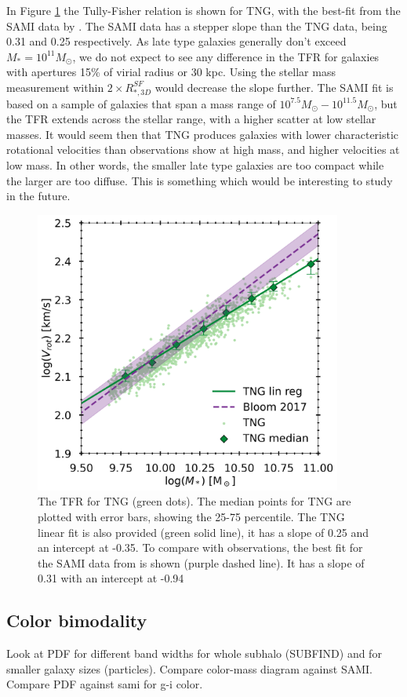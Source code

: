 In Figure \ref{TFR} the Tully-Fisher relation is shown for TNG, with the best-fit from the SAMI data by \textcite{Bloom2017}. The SAMI data has a stepper slope than the TNG data, being 0.31 and 0.25 respectively. As late type galaxies generally don't exceed $M_* = 10^{11} M_{\odot}$, we do not expect to see any difference in the TFR for galaxies with apertures 15\% of virial radius or 30 kpc. Using the stellar mass measurement within $2 \times R_{*, 3D}^{SF}$ would decrease the slope further. The SAMI fit is based on a sample of galaxies that span a mass range of $10^{7.5} M_{\odot} - 10^{11.5} M_{\odot}$, but the TFR extends across the stellar range, with a higher scatter at low stellar masses. It would seem then that TNG produces galaxies with lower characteristic rotational velocities than observations show at high mass, and higher velocities at low mass. In other words, the smaller late type galaxies are too compact while the larger are too diffuse. This is something which would be interesting to study in the future.

\begin{figure}
    \centering
    \includegraphics[width=0.9\textwidth]{images/TFR.png}
    \caption{The TFR for TNG (green dots). The median points for TNG are plotted with error bars, showing the 25-75 percentile. The TNG linear fit is also provided (green solid line), it has a slope of 0.25 and an intercept at -0.35. To compare with observations, the best fit for the SAMI data from \textcite{Bloom2017} is shown (purple dashed line). It has a slope of 0.31 with an intercept at -0.94 }
    \label{TFR}
\end{figure}

\subsection{Color bimodality}

Look at PDF for different band widths for whole subhalo (SUBFIND) and for smaller galaxy sizes (particles).
Compare color-mass diagram against SAMI.
Compare PDF against sami for g-i color.

